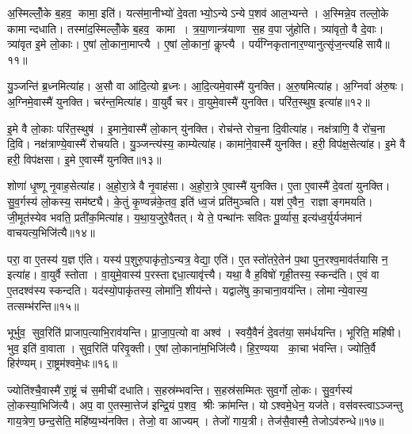 अ॒स्मिल्लोँ॒के ब॒हव॒ कामा॒ इति॑।
यत्स॑मा॒नीभ्यो॑ दे॒वताभ्यो॒ऽन्येऽन्ये प॒शव॑ आल॒भ्यन्ते।
अ॒स्मिन्ने॒व तल्लो॒के कामान्दधाति।
तस्मा॑द॒स्मिल्लोँ॒के ब॒हव॒ कामा।
त्र॒या॒णान्त्र॑याणा स॒ह व॒पा जु॑होति।
त्र्या॑वृतो॒ वै दे॒वाः।
त्र्या॑वृत इ॒मे लो॒काः।
ए॒षां लो॒काना॒माप्त्यै।
ए॒षां लो॒कानां॒ कॢप्त्यै।
पर्य॑ग्निकृतानार॒ण्यानुत्सृ॑ज॒न्त्यहिसायै॥११॥\anuvakamend[अव॑रुद्ध्या उ॒भयान्प॒शूनाल॑भते स॒त्यादहिसायै]

यु॒ञ्जन्ति॑ ब्र॒ध्नमित्या॑ह।
अ॒सौ वा आ॑दि॒त्यो ब्र॒ध्नः।
आ॒दि॒त्यमे॒वास्मै॑ युनक्ति।
अ॒रु॒षमित्या॑ह।
अ॒ग्निर्वा अ॑रु॒षः।
अ॒ग्निमे॒वास्मै॑ युनक्ति।
चर॑न्त॒मित्या॑ह।
वा॒युर्वै चर\sn{}।
वा॒युमे॒वास्मै॑ युनक्ति।
परि॑त॒स्थुष॒ इत्या॑ह॥१२॥

इ॒मे वै लो॒काः परि॑त॒स्थुष॑।
इ॒माने॒वास्मै॑ लो॒कान् यु॑नक्ति।
रोच॑न्ते रोच॒ना दि॒वीत्या॑ह।
नक्ष॑त्राणि॒ वै रो॑च॒ना दि॒वि।
नक्ष॑त्राण्ये॒वास्मै॑ रोचयति।
यु॒ञ्जन्त्य॑स्य॒ काम्येत्या॑ह।
कामा॑ने॒वास्मै॑ युनक्ति।
हरी॒ विप॑क्ष॒सेत्या॑ह।
इ॒मे वै हरी॒ विप॑क्षसा।
इ॒मे ए॒वास्मै॑ युनक्ति॥१३॥

शोणा॑ धृ॒ष्णू नृ॒वाह॒सेत्या॑ह।
अ॒हो॒रा॒त्रे वै नृ॒वाह॑सा।
अ॒हो॒रा॒त्रे ए॒वास्मै॑ युनक्ति।
ए॒ता ए॒वास्मै॑ दे॒वता॑ युनक्ति।
सु॒व॒र्गस्य॑ लो॒कस्य॒ सम॑ष्ट्यै।
के॒तुं कृ॒ण्वन्न॑के॒तव॒ इति॑ ध्व॒जं प्रति॑मुञ्चति।
यश॑ ए॒वैन॒ राज्ञाङ्गमयति।
जी॒मूत॑स्येव भवति॒ प्रती॑क॒मित्या॑ह।
य॒था॒य॒जुरे॒वैतत्।
ये ते॒ पन्था॑नः सवितः पू॒र्व्यास॒ इत्य॑ध्व॒र्युर्यज॑मानं वाचयत्य॒भिजि॑त्यै॥१४॥

परा॒ वा ए॒तस्य॑ य॒ज्ञ ए॑ति।
यस्य॑ प॒शुरु॒पाकृ॑तो॒ऽन्यत्र॒ वेद्या॒ एति॑।
ए॒तस्तो॑तरे॒तेन॑ प॒था पुन॒रश्व॒माव॑र्तयासि न॒ इत्या॑ह।
वा॒युर्वै स्तोता।
वा॒युमे॒वास्य॑ प॒रस्ताद्दधा॒त्यावृ॑त्त्यै।
यथा॒ वै ह॒विषो॑ गृही॒तस्य॒ स्कन्द॑ति।
ए॒वं वा ए॒तदश्व॑स्य स्कन्दति।
यद॑स्यो॒पाकृ॑तस्य॒ लोमा॑नि॒ शीय॑न्ते।
यद्वाले॑षु का॒चाना॒वय॑न्ति।
लोमान्ये॒वास्य॒ तत्सम्भ॑रन्ति॥१५॥

भूर्भुव॒ सुव॒रिति॑ प्राजाप॒त्याभि॒राव॑यन्ति।
प्रा॒जा॒प॒त्यो वा अश्व॑।
स्वयै॒वैनं॑ दे॒वत॑या॒ सम॑र्धयन्ति।
भूरिति॒ महि॑षी।
भुव॒ इति॑ वा॒वाता।
सुव॒रिति॑ परिवृ॒क्ती।
ए॒षां लो॒काना॑म॒भिजि॑त्यै।
हि॒र॒ण्यया का॒चा भ॑वन्ति।
ज्योति॒र्वै हिर॑ण्यम्।
रा॒ष्ट्रम॑श्वमे॒धः॥१६॥

ज्योति॑श्चै॒वास्मै॑ रा॒ष्ट्रं च॑ स॒मीची॑ दधाति।
स॒हस्र॑म्भवन्ति।
स॒हस्र॑सम्मितः सुव॒र्गो लो॒कः।
सु॒व॒र्गस्य॑ लो॒कस्या॒भिजि॑त्यै।
अप॒ वा ए॒तस्मा॒त्तेज॑ इन्द्रि॒यं प॒शव॒ श्रीः क्रा॑मन्ति।
योऽश्वमे॒धेन॒ यज॑ते।
वस॑वस्त्वाऽञ्जन्तु गाय॒त्रेण॒ छन्द॒सेति॒ महि॑ष्य॒भ्य॑नक्ति।
तेजो॒ वा आज्यम्।
तेजो॑ गाय॒त्री।
तेज॑सै॒वास्मै॒ तेजोऽव॑रुन्धे॥१७॥

